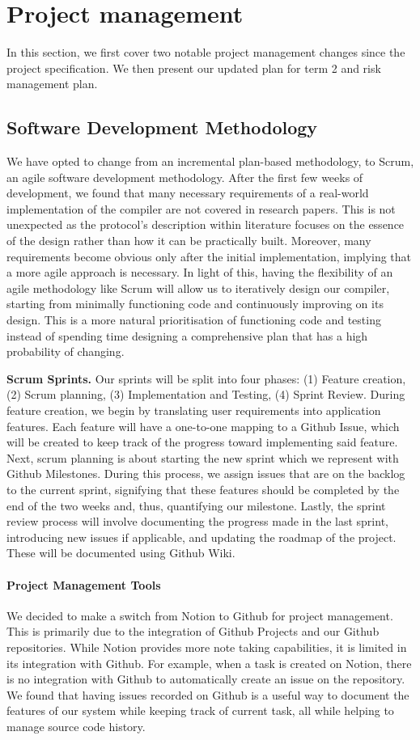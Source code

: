 \section{Project management}
In this section, we first cover two notable project management changes since the project specification. We then present our updated plan for term 2 and risk management plan.

\subsection{Software Development Methodology} 
We have opted to change from an incremental plan-based methodology, to Scrum, an agile software development methodology. After the first few weeks of development, we found that many necessary requirements of a real-world implementation of the compiler are not covered in research papers. This is not unexpected as the protocol's description within literature focuses on the essence of the design rather than how it can be practically built. Moreover, many requirements become obvious only after the initial implementation, implying that a more agile approach is necessary. In light of this, having the flexibility of an agile methodology like Scrum will allow us to iteratively design our compiler, starting from minimally functioning code and continuously improving on its design. This is a more natural prioritisation of functioning code and testing instead of spending time designing a comprehensive plan that has a high probability of changing.

\textbf{Scrum Sprints.} Our sprints will be split into four phases: (1) Feature creation, (2) Scrum planning, (3) Implementation and Testing, (4) Sprint Review. During feature creation, we begin by translating user requirements into application features. Each feature will have a one-to-one mapping to a Github Issue, which will be created to keep track of the progress toward implementing said feature. Next, scrum planning is about starting the new sprint which we represent with Github Milestones. During this process, we assign issues that are on the backlog to the current sprint, signifying that these features should be completed by the end of the two weeks and, thus, quantifying our milestone. Lastly, the sprint review process will involve documenting the progress made in the last sprint, introducing new issues if applicable, and updating the roadmap of the project. These will be documented using Github Wiki.

\paragraph{Project Management Tools}
We decided to make a switch from Notion to Github for project management. This is primarily due to the integration of Github Projects and our Github repositories. While Notion provides more note taking capabilities, it is limited in its integration with Github. For example, when a task is created on Notion, there is no integration with Github to automatically create an issue on the repository. We found that having issues recorded on Github is a useful way to document the features of our system while keeping track of current task, all while helping to manage source code history. 

